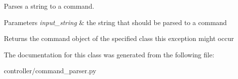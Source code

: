 Parses a string to a command. 


\begin{DoxyParams}{Parameters}
{\em input\+\_\+string} & the string that should be parsed to a command \\
\hline
\end{DoxyParams}
\begin{DoxyReturn}{Returns}
the command object of the specified class  this exception might occur 
\end{DoxyReturn}


The documentation for this class was generated from the following file\+:\begin{DoxyCompactItemize}
\item 
controller/command\+\_\+parser.\+py\end{DoxyCompactItemize}
